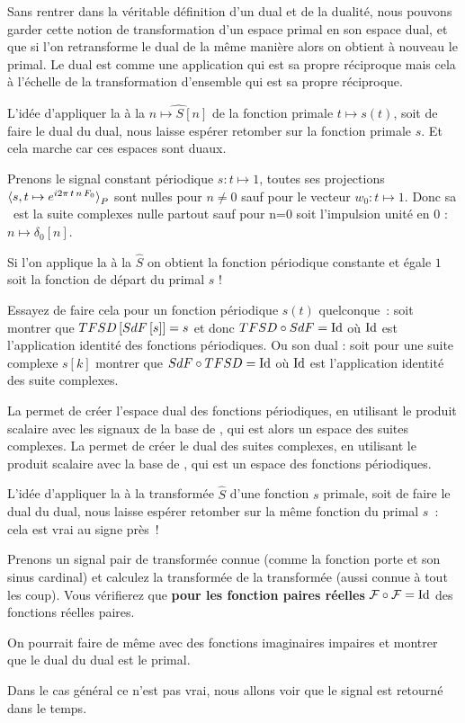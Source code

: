 Sans rentrer dans la véritable définition d'un dual et de la dualité,
nous pouvons garder cette notion de transformation d'un espace primal
en son espace dual, et que si l'on retransforme le dual de la même
manière alors on obtient à nouveau le primal. Le dual est comme une
application qui est sa propre réciproque mais cela à l'échelle de la
transformation d'ensemble qui est sa propre réciproque.

L'idée d'appliquer la \TFSD{} à la \sdf{} $\hat{n\mapsto S[n]}$ de la
fonction primale $t\mapsto s(t)$, soit de faire le dual du dual, nous
laisse espérer retomber sur la fonction primale $s$. Et cela marche
car ces espaces sont duaux.

\begin{exercice}
  Prenons le signal constant périodique $s : t\mapsto 1$, toutes ses
  projections $\langle s,t\mapsto e^{i2\pi\,t\,n\,F_0}{\rangle}_P$ sont nulles pour
  $n\neq0$ sauf pour le vecteur $w_0 : t\mapsto 1$. Donc sa \sdf{} est
  la suite complexes nulle partout sauf pour n=0 soit  l'impulsion
  unité en 0 : $n\mapsto\delta_0[n]$.

  Si l'on applique la \TFSD{} à la \sdf{} $\hat{S}$ on obtient la fonction périodique constante et égale $1$ soit la fonction de départ du primal $s$ !

  Essayez de faire cela pour un fonction périodique $s(t)$ quelconque~:  soit montrer que $TFSD{}\left[SdF{}\left[s\right]\right]=s$ et donc $TFSD{} \circ SdF{} = \mathrm{Id}$ où $\mathrm{Id}$ est l'application identité des fonctions périodiques.
  Ou son dual : soit pour une suite complexe $s[k]$ montrer que $SdF \circ TFSD = \mathrm{Id}$ où $\mathrm{Id}$ est l'application identité des suite complexes.
  
\end{exercice}


La \sdf{} permet de créer l'espace dual des fonctions périodiques, en
utilisant le produit scalaire avec les signaux de la base de \Fourier,
qui est alors un espace des suites complexes. La \TFSD{} permet de
créer le dual des suites complexes, en utilisant le produit scalaire
avec la base de \Fourier{}, qui est un espace des fonctions
périodiques.

L'idée d'appliquer la \TF{} à la transformée $\hat{S}$ d'une fonction
$s$ primale, soit de faire le dual du dual, nous laisse espérer
retomber sur la même fonction du primal $s$~: cela est vrai au signe
près~!


\begin{exercice}
  Prenons un signal pair de transformée connue (comme la fonction
  porte et son sinus cardinal) et calculez la transformée de la
  transformée (aussi connue à tout les coup). Vous vérifierez que
  \textbf{pour les fonction paires réelles} $\mathcal{F}{}\circ\mathcal{F}{}=\mathrm{Id}$ des
  fonctions réelles paires.

  On pourrait faire de même avec des fonctions imaginaires impaires et
  montrer que le dual du dual est le primal.

  Dans le cas général ce n'est pas vrai, nous allons voir que le signal est retourné dans le temps.
  
\end{exercice}

